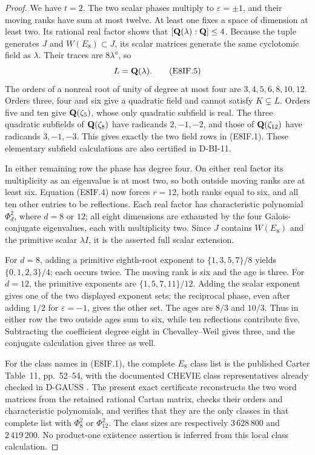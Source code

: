 \begin{proof}
We have $t=2$. The two scalar phases multiply to $\varepsilon=\pm1$,
and their moving ranks have sum at most twelve. At least one fixes a
space of dimension at least two. Its rational real factor shows that
$[\mathbf Q(\lambda):\mathbf Q]\le4$. Because the tuple generates $J$ and
$W(E_8)\subset J$, its scalar matrices generate the same cyclotomic
field as $\lambda$. Their traces are $8\lambda^a$, so
\[
                         L=\mathbf Q(\lambda).                    \tag{E8IF.5}
\]
The orders of a nonreal root of unity of degree at most four are
$3,4,5,6,8,10,12$. Orders three, four and six give a quadratic
field and cannot satisfy $K\subsetneq L$. Orders five and ten
give $\mathbf Q(\zeta_5)$, whose only quadratic subfield is real.
The three quadratic subfields of $\mathbf Q(\zeta_8)$ have radicands
$2,-1,-2$, and those of $\mathbf Q(\zeta_{12})$ have radicands
$3,-1,-3$. This gives exactly the two field rows in (E8IF.1).
These elementary subfield calculations are also certified in D-BI-11.

In either remaining row the phase has degree four. On either real
factor its multiplicity as an eigenvalue is at most two, so both
outside moving ranks are at least six. Equation (E8IF.4) now forces
$r=12$, both ranks equal to six, and all ten other entries to be
reflections. Each real factor has characteristic polynomial
$\Phi_d^2$, where $d=8$ or $12$; all eight dimensions are exhausted
by the four Galois-conjugate eigenvalues, each with multiplicity two.
Since $J$ contains $W(E_8)$ and the primitive scalar $\lambda I$,
it is the asserted full scalar extension.

For $d=8$, adding a primitive eighth-root exponent to
$\{1,3,5,7\}/8$ yields $\{0,1,2,3\}/4$; each occurs twice.
The moving rank is six and the age is three. For $d=12$, the
primitive exponents are $\{1,5,7,11\}/12$. Adding the scalar
exponent gives one of the two displayed exponent sets; the reciprocal phase,
even after adding $1/2$ for $\varepsilon=-1$, gives the other set.
The ages are $8/3$ and $10/3$. Thus in either row the two outside
ages sum to six, while ten reflections contribute five. Subtracting
the coefficient degree eight in Chevalley--Weil gives three, and
the conjugate calculation gives three as well.

For the class names in (E8IF.1), the complete $E_8$ class list is
the published Carter Table~11, pp.~52--54, with the documented
CHEVIE class representatives already checked in D-GAUSS
\cite{WG:Carter,WG:CHEVIE}. The present exact certificate reconstructs
the two word matrices from the retained rational Cartan matrix,
checks their orders and characteristic polynomials, and verifies that
they are the only classes in that complete list with $\Phi_8^2$
or $\Phi_{12}^2$. The class sizes are respectively $3\,628\,800$
and $2\,419\,200$. No product-one existence assertion is inferred
from this local class calculation.
\end{proof}
